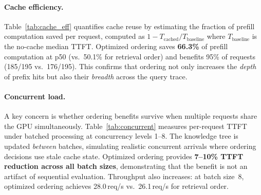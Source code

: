 \documentclass{article}
\begin{document}
\paragraph{Cache efficiency.}
Table~\ref{tab:cache_eff} quantifies cache reuse by estimating the fraction of prefill computation saved per request, computed as $1 - T_{\text{cached}} / T_{\text{baseline}}$ where $T_{\text{baseline}}$ is the no-cache median TTFT. Optimized ordering saves \textbf{66.3\%} of prefill computation at p50 (vs.\ 50.1\% for retrieval order) and benefits 95\% of requests (185/195 vs.\ 176/195). This confirms that ordering not only increases the \emph{depth} of prefix hits but also their \emph{breadth} across the query trace.

\begin{table}[t]
\caption{Cache efficiency: prefill saved per request (RTX 4090, 195 queries, baseline p50 = 116\,ms).}
\label{tab:cache_eff}
\centering
\small
{}
\vspace{-0.5em}
\end{table}

\paragraph{Concurrent load.}
A key concern is whether ordering benefits survive when multiple requests share the GPU simultaneously. Table~\ref{tab:concurrent} measures per-request TTFT under batched processing at concurrency levels 1--8. The knowledge tree is updated \emph{between} batches, simulating realistic concurrent arrivals where ordering decisions use stale cache state. Optimized ordering provides \textbf{7--10\% TTFT reduction across all batch sizes}, demonstrating that the benefit is not an artifact of sequential evaluation. Throughput also increases: at batch size~8, optimized ordering achieves 28.0\,req/s vs.\ 26.1\,req/s for retrieval order.
\end{document}
